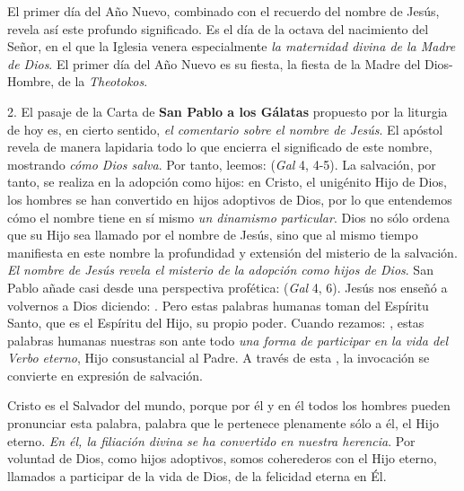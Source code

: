 \begin{body}
	El primer día del Año Nuevo, combinado con el recuerdo del nombre de Jesús, revela así este profundo significado. Es el día de la octava del nacimiento del Señor, en el que la Iglesia venera especialmente \emph{la maternidad divina de la Madre de Dios}. El primer día del Año Nuevo es su fiesta, la fiesta de la Madre del Dios-Hombre, de la \emph{Theotokos}.

	2. El pasaje de la Carta de \textbf{San Pablo a los Gálatas} propuesto por la liturgia de hoy es, en cierto sentido, \emph{el comentario sobre el nombre de Jesús}. El apóstol revela de manera lapidaria todo lo que encierra el significado de este nombre, mostrando \emph{cómo Dios salva}. Por tanto, leemos:  (\emph{Gal} 4, 4-5). La salvación, por tanto, se realiza en la adopción como hijos: en Cristo, el unigénito Hijo de Dios, los hombres se han convertido en hijos adoptivos de Dios, por lo que entendemos cómo el nombre  tiene en sí mismo \emph{un dinamismo particular}. Dios no sólo ordena que su Hijo sea llamado por el nombre de Jesús, sino que al mismo tiempo manifiesta en este nombre la profundidad y extensión del misterio de la salvación. \emph{El nombre de Jesús revela el misterio de la adopción como hijos de Dios}. San Pablo añade casi desde una perspectiva profética:  (\emph{Gal} 4, 6). Jesús nos enseñó a volvernos a Dios diciendo: . Pero estas palabras humanas toman del Espíritu Santo, que es el Espíritu del Hijo, su propio poder. Cuando rezamos: , estas palabras humanas nuestras son ante todo \emph{una forma de participar en la vida del Verbo eterno}, Hijo consustancial al Padre. A través de esta , la invocación  se convierte en expresión de salvación.

	Cristo es el Salvador del mundo, porque por él y en él todos los hombres pueden pronunciar esta palabra, palabra que le pertenece plenamente sólo a él, el Hijo eterno. \emph{En él, la filiación divina se ha convertido en nuestra herencia}. Por voluntad de Dios, como hijos adoptivos, somos coherederos con el Hijo eterno, llamados a participar de la vida de Dios, de la felicidad eterna en Él.


\end{body}
